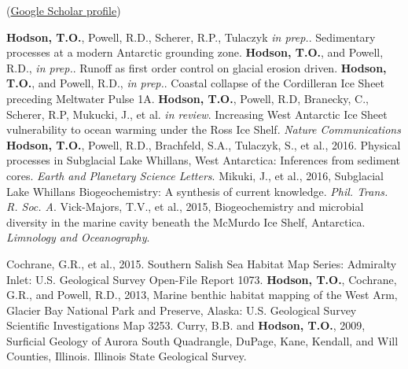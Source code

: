 \renewcommand{\refname}{Journal Publications} 
(\href{https://scholar.google.com/citations?user=3odnPwwAAAAJ&hl=en}{Google Scholar profile})
\begin{thebibliography}{1}
\bibitem{}\textbf{Hodson, T.O.}, Powell, R.D., Scherer, R.P., Tulaczyk \textsl{in prep.}. Sedimentary processes at a modern Antarctic grounding zone.
\bibitem{}\textbf{Hodson, T.O.}, and Powell, R.D., \textsl{in prep.}. Runoff as first order control on glacial erosion driven.
\bibitem{}\textbf{Hodson, T.O.}, and Powell, R.D., \textsl{in prep.}. Coastal collapse of the Cordilleran Ice Sheet preceding Meltwater Pulse 1A.
\bibitem{}\textbf{Hodson, T.O.}, Powell, R.D, Branecky, C., Scherer, R.P, Mukucki, J., et al. 
    \textsl{in review}. Increasing West Antarctic Ice Sheet vulnerability to ocean warming under the Ross Ice Shelf. \textsl{Nature Communications}
\bibitem{}\textbf{Hodson, T.O.}, Powell, R.D., Brachfeld, S.A., Tulaczyk, S., et al., 2016. Physical processes in Subglacial Lake Whillans, West Antarctica: Inferences from sediment cores.
\textsl{Earth and Planetary Science Letters}.
\bibitem{}Mikuki, J., et al., 2016, Subglacial Lake Whillans Biogeochemistry: A synthesis of current knowledge. \textsl{Phil. Trans. R. Soc. A}.
\bibitem{}Vick-Majors, T.V., et al., 2015, Biogeochemistry and microbial diversity in the marine cavity beneath the McMurdo Ice Shelf, Antarctica.
\textsl{Limnology and Oceanography}.
\end{thebibliography}
\renewcommand{\refname}{Other Publications}
\begin{thebibliography}{1}
\bibitem{}Cochrane, G.R., et al., 2015. Southern Salish Sea Habitat Map Series: Admiralty Inlet: U.S. Geological Survey Open-File Report 1073.
\bibitem{}\textbf{Hodson, T.O.}, Cochrane, G.R., and Powell, R.D., 2013, Marine benthic habitat mapping of the West Arm, Glacier Bay National Park and Preserve, Alaska: U.S. Geological Survey Scientific Investigations Map 3253.
\bibitem{}Curry, B.B. and \textbf{Hodson, T.O.}, 2009, Surficial Geology of Aurora South Quadrangle, DuPage, Kane, Kendall, and Will Counties, Illinois. Illinois State Geological Survey.
\end{thebibliography}

